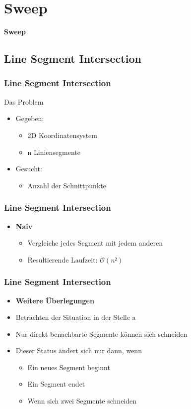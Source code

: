 \section{Sweep}
\begin{frame}
	\begin{center}
		\textbf{Sweep}
	\end{center}
\end{frame}

\subsection{Line Segment Intersection}
\begin{frame}
	\frametitle{{Line Segment Intersection}}
	\begin{block}{Das Problem}
	\begin{itemize}
		\pause
		\item{Gegeben:}
		\pause
		\begin{itemize}
			\item{2D Koordinatensystem}
			\pause
			\item{n Liniensegmente}
		\end{itemize}
		\pause
		\item{Gesucht:}
		\pause
		\begin{itemize}
			\item{Anzahl der Schnittpunkte}
		\end{itemize}
	\end{itemize}
	\end{block}
\end{frame}
\begin{frame}
	\frametitle{{Line Segment Intersection}}
	\begin{itemize}
		\item \textbf{Naiv}
		\begin{itemize}
			\pause
			\item{Vergleiche jedes Segment mit jedem anderen}
			\pause
			\item{Resultierende Laufzeit: $\mathcal O(n²)$}
		\end{itemize}
	\end{itemize}
\end{frame}
\begin{frame}
	\frametitle{{Line Segment Intersection}}
	\begin{itemize}
		\item \textbf{Weitere \"Uberlegungen}
		\pause
		\item{Betrachten der Situation in der Stelle a}
		\pause
		\item{Nur direkt benachbarte Segmente k\"onnen sich schneiden}
		\pause
		\item{Dieser Status \"andert sich nur dann, wenn}
		\begin{itemize}
			\pause
			\item{Ein neues Segment beginnt}
			\pause
			\item{Ein Segment endet}
			\pause
			\item{Wenn sich zwei Segmente schneiden}
		\end{itemize}
	\end{itemize}
\end{frame}
